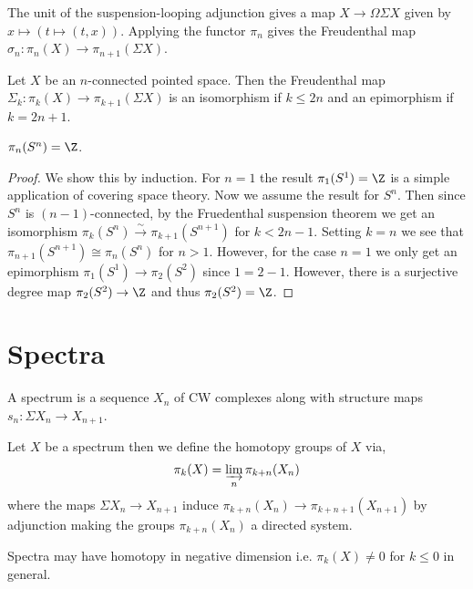 \documentclass[12pt]{extarticle}
\begin{document}
\begin{remark}
The unit of the suspension-looping adjunction gives a map $X \to \Omega \Sigma X$ given by $x \mapsto (t \mapsto (t, x))$. Applying the functor $\pi_n$ gives the Freudenthal map $\sigma_n : \pi_n(X) \to \pi_{n+1}(\Sigma X)$. 
\end{remark}

\begin{theorem}
Let $X$ be an $n$-connected pointed space. Then the Freudenthal map $\Sigma_k : \pi_k(X) \to \pi_{k+1}(\Sigma X)$ is an isomorphism if $k \le 2n$ and an epimorphism if $k = 2 n + 1$. 
\end{theorem}

\begin{corollary}
$\pi_n(S^n) = \Z$.
\end{corollary}

\begin{proof}
We show this by induction. For $n = 1$ the result $\pi_1(S^1) = \Z$ is a simple application of covering space theory. Now we assume the result for $S^n$. Then since $S^n$ is $(n-1)$-connected, by the Fruedenthal suspension theorem we get an isomorphism $\pi_k(S^n) \xrightarrow{\sim} \pi_{k+1}(S^{n+1})$ for $k < 2n - 1$. Setting $k = n$ we see that $\pi_{n+1}(S^{n+1}) \cong \pi_{n}(S^n)$ for $n > 1$. However, for the case $n = 1$ we only get an epimorphism $\pi_1(S^1) \to \pi_2(S^2)$ since $1 = 2 - 1$. However, there is a surjective degree map $\pi_2(S^2) \to \Z$ and thus $\pi_2(S^2) = \Z$.  
\end{proof}

\section{Spectra}

\begin{definition}
A spectrum is a sequence $X_n$ of CW complexes along with structure maps $s_n : \Sigma X_n \to X_{n+1}$. 
\end{definition}

\begin{definition}
Let $X$ be a spectrum then we define the homotopy groups of $X$ via,
\[ \pi_k(X) = \varinjlim_n \pi_{k + n}(X_n) \]
where the maps $\Sigma X_n \to X_{n+1}$ induce $\pi_{k + n}(X_n) \to \pi_{k + n +1}(X_{n+1})$ by adjunction making the groups $\pi_{k + n}(X_n)$ a directed system.
\end{definition}

\begin{remark}
Spectra may have homotopy in negative dimension i.e. $\pi_k(X) \neq 0$ for $k \le 0$ in general. 
\end{remark}
\end{document}
